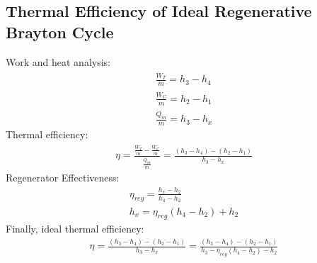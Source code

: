 \documentclass[class=report, crop=false, 12pt,a4paper]{standalone}
\numberwithin{equation}{section}
\begin{document}
\subsection{Thermal Efficiency of Ideal Regenerative Brayton Cycle}
Work and heat analysis:
\begin{gather}
  \frac{\dot{W}_T}{\dot{m}} = h_3-h_4 \\[5pt]
  \frac{\dot{W}_C}{\dot{m}} = h_2-h_1 \\[5pt]
  \frac{\dot{Q}_{in}}{\dot{m}} = h_3-h_x
\end{gather}
Thermal efficiency: 
\begin{gather}
  \eta = \frac{\frac{\dot{W}_T}{\dot{m}}-\frac{\dot{W}_C}{\dot{m}}}{\frac{\dot{Q}_{in}}{\dot{m}}} = \frac{(h_3-h_4)-(h_2-h_1)}{h_3-h_x}
\end{gather}
Regenerator Effectiveness:
\begin{gather}
  \eta_{reg} = \frac{h_x-h_2}{h_4-h_2} \\[5pt]
  h_x = \eta_{reg}(h_4-h_2)+h_2
\end{gather}
Finally, ideal thermal efficiency:
\begin{gather}
  \eta = \frac{(h_3-h_4)-(h_2-h_1)}{h_3-h_x} = \frac{(h_3-h_4)-(h_2-h_1)}{h_3-\eta_{reg}(h_4-h_2)-h_2}
\end{gather}
\end{document}
